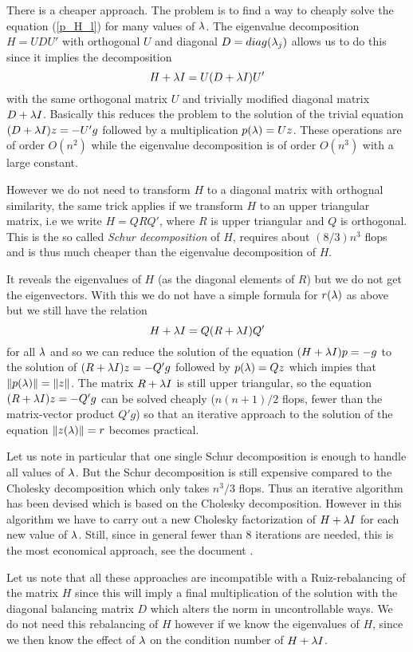 There is a cheaper approach. The problem is to find a way to cheaply solve the equation (\ref{p_H_l}) for many values   
of $\lambda$. The eigenvalue decomposition $H=UDU'$ with orthogonal $U$ and diagonal $D=diag(\lambda_j)$ allows us to do this   
since it implies the decomposition
$$
H+\lambda I=U(D+\lambda I)U'
$$
with the same orthogonal matrix $U$ and trivially modified diagonal matrix $D+\lambda I$. Basically this reduces the problem
to the solution of the trivial equation $(D+\lambda I)z=-U'g$ followed by a multiplication $p(\lambda)=Uz$. These operations are of 
order $O(n^2)$ while the eigenvalue decomposition is of order $O(n^3)$ with a large constant.

However we do not need to transform $H$ to a diagonal matrix with orthognal similarity, the same trick applies if we
transform $H$ to an upper triangular matrix, i.e we write $H=QRQ'$, where $R$ is upper triangular and $Q$ is orthogonal.
This is the so called \textit{Schur decomposition} of $H$, requires about $(8/3)n^3$ flops and is thus much cheaper
than the eigenvalue decomposition of $H$.

It reveals the eigenvalues of $H$ (as the diagonal elements of $R$) but we do not get the eigenvectors. With this we do
not have a simple formula for $r(\lambda)$ as above but we still have the relation
$$
H+\lambda I = Q(R+\lambda I)Q'
$$
for all $\lambda$ and so we can reduce the solution of the equation $(H+\lambda I)p=-g$ to the solution of $(R+\lambda I)z=-Q'g$
followed by $p(\lambda)=Qz$ which impies that $\left\|p(\lambda)\right\|=\left\|z\right\|$. The matrix $R+\lambda I$ is still upper triangular, 
so the equation $(R+\lambda I)z=-Q'g$ can be solved cheaply ($n(n+1)/2$ flops, fewer than the matrix-vector product 
$Q'g$) so that an iterative approach to the solution of the equation $\left\|z(\lambda)\right\|=r$ becomes practical.

Let us note in particular that one single Schur decomposition is enough to handle all values of $\lambda$. But the Schur 
decomposition is still expensive compared to the Cholesky decomposition which only takes $n^3/3$ flops. Thus an 
iterative algorithm has been devised which is based on the Cholesky decomposition. However in this algorithm we have
to carry out a new Cholesky factorization of $H+\lambda I$ for each new value of $\lambda$. Still, since in general fewer than
8 iterations are needed, this is the most economical approach, see the document \cite{NG}.

Let us note that all these approaches are incompatible with a Ruiz-rebalancing of the matrix $H$
since this will imply a final multiplication of the solution with the diagonal balancing matrix
$D$ which alters the norm in uncontrollable ways. We do not need this rebalancing of $H$ however if
we know the eigenvalues of $H$, since we then know the effect of $\lambda$ on the condition number of
$H+\lambda I$.

